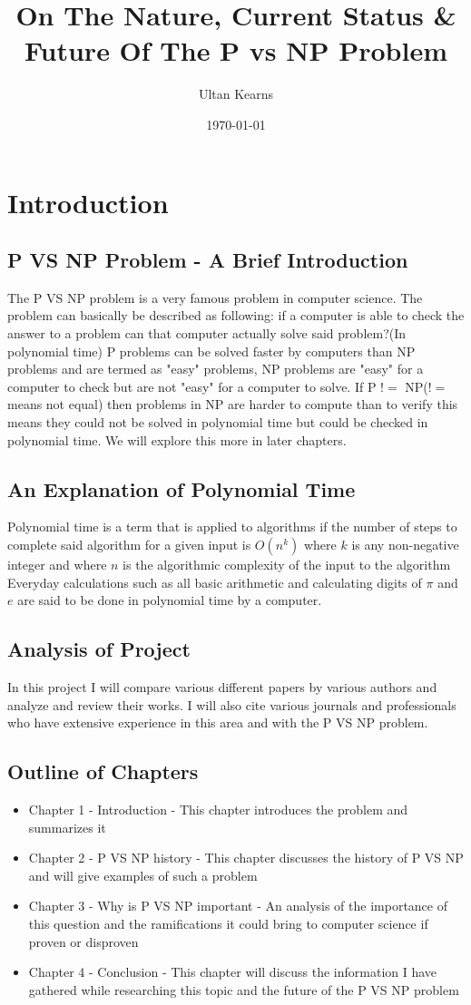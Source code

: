 \documentclass{report}
\title{On The Nature, Current Status \& Future Of The P vs NP Problem}
\author{Ultan Kearns}
\date{\today}
\begin{document}
\maketitle
\tableofcontents
\chapter{Introduction}
\section{P VS NP Problem - A Brief Introduction}
The P VS NP problem is a very famous problem in computer science.  The problem
can basically be described as following: if a computer is able to check the answer
to a problem can that computer actually solve said problem?(In polynomial time)\cite{pvsnpmit}  P problems can be
solved faster by computers than NP problems and are termed as "easy" problems, NP problems
are "easy" for a computer to check but are not "easy" for a computer to solve.\cite{pvsnpmit}
If P $!=$ NP($!=$ means not equal) then problems in NP are harder to compute than to verify
this means they could not be solved in polynomial time but could be checked in polynomial time.  We will explore this more in later chapters.
\section{An Explanation of Polynomial Time}
Polynomial time is a term that is applied to algorithms if the number of steps
to complete said algorithm for a given input is $O(n^k)$ where $k$ is any non-negative
integer and where $n$ is the algorithmic complexity of the input to the algorithm \cite{polynomial}
Everyday calculations such as all basic arithmetic and calculating digits of $\pi$ and $e$ are said
to be done in polynomial time by a computer\cite{polynomial}.
\section{Analysis of Project}
In this project I will compare various different papers by various authors and
analyze and review their works.  I will also cite various journals and professionals
who have extensive experience in this area and with the P VS NP problem.
\section{Outline of Chapters}
\begin{itemize}
  \item Chapter 1 - Introduction - This chapter introduces the problem and summarizes it
  \item  Chapter 2 - P VS NP history - This chapter discusses the history of P VS NP and will give examples of such a problem
  \item Chapter 3 - Why is P VS NP important - An analysis of the importance of this question and the ramifications it could bring to computer science if proven or disproven
  \item Chapter 4 - Conclusion - This chapter will discuss the information I have gathered while researching this topic and the future of the P VS NP problem
\end{itemize}
\end{document}
